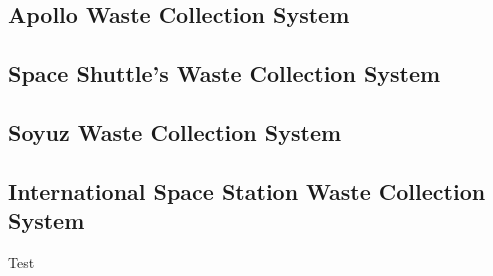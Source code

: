     \subsection{Apollo Waste Collection System}

    \subsection{Space Shuttle's Waste Collection System}

    \subsection{Soyuz Waste Collection System}

    \subsection{International Space Station Waste Collection System}

    Test \autocite{iss_background}

 
    \pagebreak
    \vspace{-3em}
{
    \printbibliography[title = {References}]

    \thispagestyle{empty}
}

